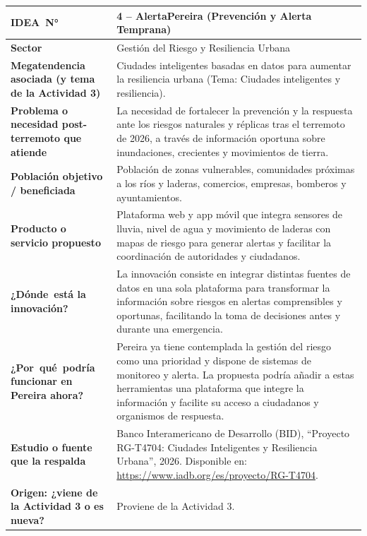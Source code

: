 \documentclass[11pt,a4paper]{article}
\newcommand{\fichaactividad}[9]{%
    \def\fIdea{#1}%
    \def\fSector{#2}%
    \def\fMega{#3}%
    \def\fProb{#4}%
    \def\fPobl{#5}%
    \def\fProd{#6}%
    \def\fInno{#7}%
    \def\fPere{#8}%
    \def\fFuen{#9}%
    \fichaactividadb%
}
\newcommand{\fichaactividadb}[1]{%
\begin{table}[H]
\centering
\sffamily
\renewcommand{\arraystretch}{1.52}
\setlength{\tabcolsep}{9pt}
\small
\begin{tabularx}{\textwidth}{|>{\centering\arraybackslash\bfseries\color{white}\columncolor{coloractualficha}\hsize=0.32\hsize}X|>{\arraybackslash\hsize=0.68\hsize}X|}
\hline
\mbox{IDEA N°} & \cellcolor{bgactualficha}\textbf{\color{coloractualficha}\fIdea} \\
\hline
Sector & \fSector \\
\hline
Megatendencia asociada (y tema de la Actividad 3) & \fMega \\
\hline
Problema o necesidad post-terremoto que atiende & \fProb \\
\hline
Población objetivo / beneficiada & \fPobl \\
\hline
Producto o servicio propuesto & \fProd \\
\hline
\mbox{¿Dónde está} la innovación? & \fInno \\
\hline
\mbox{¿Por qué podría} funcionar en Pereira ahora? & \fPere \\
\hline
Estudio o fuente que la respalda & \fFuen \\
\hline
Origen: ¿viene de la Actividad 3 o es nueva? & #1 \\
\hline
\end{tabularx}
\end{table}
}
\begin{document}
\fichaactividad
{4 -- AlertaPereira (Prevención y Alerta Temprana)}
{Gestión del Riesgo y Resiliencia Urbana}
{Ciudades inteligentes basadas en datos para aumentar la resiliencia urbana (Tema: Ciudades inteligentes y resiliencia).}
{La necesidad de fortalecer la prevención y la respuesta ante los riesgos naturales y réplicas tras el terremoto de 2026, a través de información oportuna sobre inundaciones, crecientes y movimientos de tierra.}
{Población de zonas vulnerables, comunidades próximas a los ríos y laderas, comercios, empresas, bomberos y ayuntamientos.}
{Plataforma web y app móvil que integra sensores de lluvia, nivel de agua y movimiento de laderas con mapas de riesgo para generar alertas y facilitar la coordinación de autoridades y ciudadanos.}
{La innovación consiste en integrar distintas fuentes de datos en una sola plataforma para transformar la información sobre riesgos en alertas comprensibles y oportunas, facilitando la toma de decisiones antes y durante una emergencia.}
{Pereira ya tiene contemplada la gestión del riesgo como una prioridad y dispone de sistemas de monitoreo y alerta. La propuesta podría añadir a estas herramientas una plataforma que integre la información y facilite su acceso a ciudadanos y organismos de respuesta.}
{Banco Interamericano de Desarrollo (BID), ``Proyecto RG-T4704: Ciudades Inteligentes y Resiliencia Urbana'', 2026. Disponible en: \url{https://www.iadb.org/es/proyecto/RG-T4704}.}
{Proviene de la Actividad 3.}

\newpage
\end{document}

